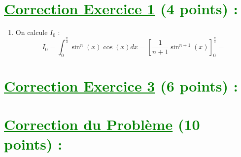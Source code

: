 \documentclass[12pt]{article}
\begin{document}
\section*{\textcolor{green}{\underline{Correction Exercice 1} (4 points) :}}

\begin{enumerate}
    \item On calcule $I_{0}$ :
    \[
I_{0}=\int_{0}^{\frac{\pi}{3}} \sin^{n}(x)\cos(x)dx=\left[ \frac{1}{n+1}\sin^{n+1}(x) \right]_{0}^{\frac{\pi}{3}}=
    \]
\end{enumerate}
\section*{\textcolor{green}{\underline{Correction Exercice 3} (6 points) :}}

\section*{\textcolor{green}{\underline{Correction du Problème} (10 points) :}}
\end{document}
